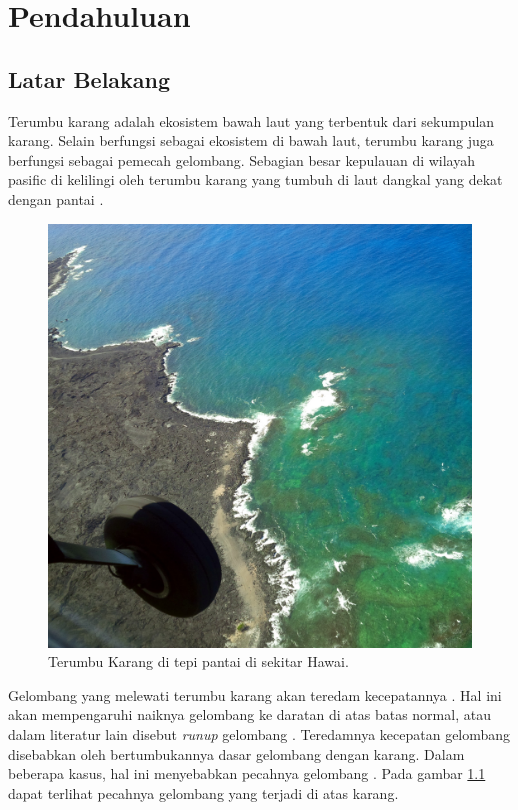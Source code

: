 \chapter{Pendahuluan}
\section{Latar Belakang}

Terumbu karang adalah ekosistem bawah laut yang terbentuk dari sekumpulan karang. Selain berfungsi sebagai ekosistem di bawah laut, terumbu karang juga berfungsi sebagai pemecah gelombang. Sebagian besar kepulauan di wilayah pasific di kelilingi oleh terumbu karang yang tumbuh di laut dangkal yang dekat dengan pantai \cite{DemirbilekBoussinesq}.

\begin{figure}[htp]
    \begin{center}
        \includegraphics[scale=0.1]{./images/hawai_coral.jpg}
    \end{center}
    \caption{Terumbu Karang di tepi pantai di sekitar Hawai.}
    \label{fig:hawai_coral}
\end{figure}

Gelombang yang melewati terumbu karang akan teredam kecepatannya \cite{DemirbilekReport}. Hal ini akan mempengaruhi naiknya gelombang ke daratan di atas batas normal, atau dalam literatur lain disebut \emph{runup} gelombang \cite{nielsen1991wave}. Teredamnya kecepatan gelombang disebabkan oleh bertumbukannya dasar gelombang dengan karang. Dalam beberapa kasus, hal ini menyebabkan pecahnya gelombang \cite{DemirbilekReport}. Pada gambar \ref{fig:hawai_coral} dapat terlihat pecahnya gelombang yang terjadi di atas karang.

